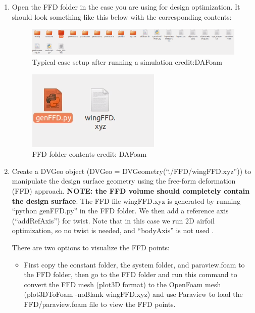 \documentclass[12pt]{article}
\begin{document}
\begin{enumerate}
\item Open the FFD folder in the case you are using for design optimization. It should look something like this below with the corresponding contents: 


\begin{figure}[ht]
    \centering
    \includegraphics[width=0.85 \textwidth]{FFDcasefolder.PNG}
    \caption{ Typical case setup after running a simulation  credit:DAFoam}
    \label{fig:my_label}
\end{figure}

\begin{figure}[ht]
    \centering
    \includegraphics[width=0.55 \textwidth]{genFFd.PNG}
    \caption{FFD folder contents  credit: DAFoam}
    \label{fig:my_label}
\end{figure}

    \item Create a DVGeo object (DVGeo = DVGeometry(“./FFD/wingFFD.xyz”)) to manipulate the design surface geometry using the free-form deformation (FFD) approach. \textbf{NOTE: the FFD volume should completely contain the design surface}. The FFD file wingFFD.xyz is generated by running “python genFFD.py” in the FFD folder. We then add a reference axis (“addRefAxis”) for twist. Note that in this case we run 2D airfoil optimization, so no twist is needed, and “bodyAxis” is not used \cite{DAFoam}.
    
    There are two options to visualize the FFD points: 
    
    \begin{itemize}
        \item First copy the constant folder, the system folder, and paraview.foam to the FFD folder, then go to the FFD folder and run this command to convert the FFD mesh (plot3D format) to the OpenFoam mesh (plot3DToFoam -noBlank wingFFD.xyz) and use Paraview to load the FFD/paraview.foam file to view the FFD points.
    

\end{itemize}
\end{enumerate}
\end{document}
